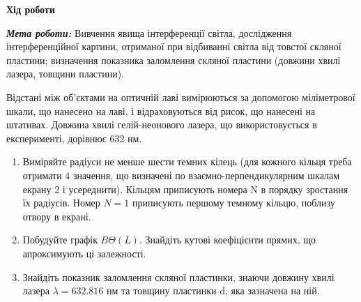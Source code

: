 \begin{center}
    \Large{\textbf{Хід роботи}}    
\end{center}

\vspace{1mm}

\textit{\textbf{Мета роботи:}} Вивчення явища інтерференції світла, дослідження інтерференційної картини,
отриманої при відбиванні світла від товстої скляної пластини; визначення
показника заломлення скляної пластини (довжини хвилі лазера, товщини пластини).
\bigbreak


Відстані між об’єктами на оптичній лаві вимірюються за допомогою
міліметрової шкали, що нанесено на лаві, і відраховуються від рисок, 
що нанесені на штативах. Довжина хвилі гелій-неонового лазера, що 
використовується в експерименті, дорівнює 632 нм.

\begin{enumerate}
    \item  Виміряйте радіуси не менше шести темних кілець (для кожного кільця
    треба отримати 4 значення, що визначені по взаємно-перпендикулярним
    шкалам екрану 2 і усереднити). Кільцям приписують номера N в порядку
    зростання їх радіусів. Номер $N = 1$ приписують першому темному кільцю,
    поблизу отвору в екрані.

    \item Побудуйте графік $B \Theta(L)$.
    Знайдіть кутові коефіцієнти 
    прямих, що апроксимують ці залежності.

    \item Знайдіть показник заломлення скляної пластинки, знаючи довжину хвилі
    лазера $\lambda = 632.816$ нм та товщину пластинки d, яка зазначена на ній.
    

\end{enumerate}